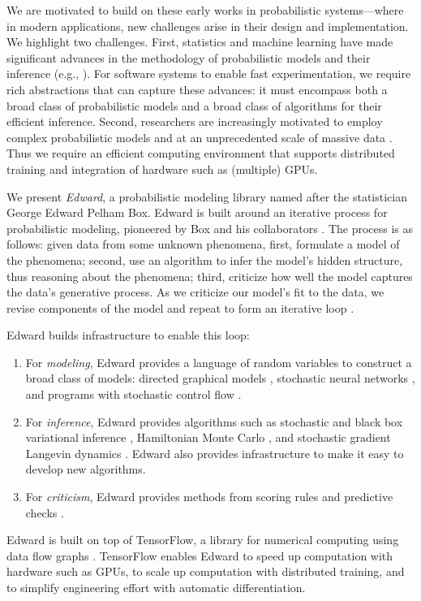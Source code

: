 We are motivated to build on these early works in probabilistic
systems---where in modern applications, new challenges arise in their
design and implementation.  We highlight two challenges.
First, statistics and machine learning have made significant advances
in the methodology of probabilistic models and their inference (e.g.,
\citet{hoffman2013stochastic,ranganath2014black,rezende2014stochastic}).
For software systems to enable fast experimentation, we require rich
abstractions that can capture these advances: it must encompass both a
broad class of probabilistic models and a broad class of algorithms
for their efficient inference.
Second, researchers are increasingly motivated to employ complex
probabilistic models and at an unprecedented scale of massive
data \citep{bengio2013representation,ghahramani2015probabilistic,lake2016building}.
Thus we require an efficient computing environment that supports
distributed training and integration of hardware such as (multiple)
GPUs.

We present \emph{Edward}, a probabilistic modeling library named after the
statistician George Edward Pelham Box. Edward is built around an iterative
process for probabilistic modeling, pioneered by Box and his collaborators
\citep{box1962useful,box1965experimental,box1967discrimination,box1976science,
box1980sampling}. The process is as follows: given data from some unknown
phenomena, first, formulate a model of the phenomena; second, use an algorithm
to infer the model's hidden structure, thus reasoning about the phenomena;
third, criticize how well the model captures the data's generative process. As
we criticize our model's fit to the data, we revise components of the model and
repeat to form an iterative
loop \citep{box1976science,blei2014build,gelman2013bayesian}.

Edward builds infrastructure to enable this loop:
\begin{enumerate}
\item
For \emph{modeling}, Edward provides a language of random variables to
construct a broad class of models: directed graphical
models \citep{pearl1988probabilistic}, stochastic neural
networks \citep{neal1990learning}, and programs with stochastic
control flow \citep{goodman2012church}.
\item
For \emph{inference}, Edward provides algorithms such as stochastic
and black box variational
inference \citep{hoffman2013stochastic,ranganath2014black},
Hamiltonian Monte Carlo \citep{neal1993probabilistic}, and stochastic
gradient Langevin dynamics \citep{welling2011bayesian}. Edward also
provides infrastructure to make it easy to develop new algorithms.
\item
For \emph{criticism}, Edward provides methods from scoring
rules \citep{winkler1996scoring} and predictive
checks \citep{box1980sampling,rubin1984bayesianly}.
\end{enumerate}
Edward is built on top of TensorFlow, a library for numerical computing
using data flow graphs \citep{abadi2016tensorflow}. TensorFlow enables
Edward to speed up computation with hardware such as GPUs, to scale
up computation with distributed training, and to simplify engineering
effort with automatic differentiation.

